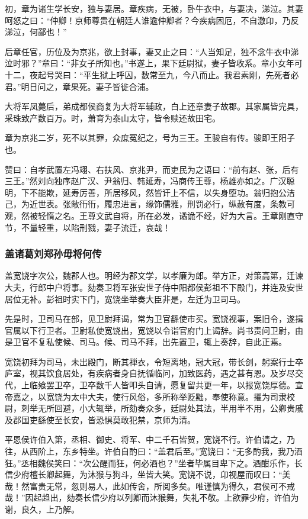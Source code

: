 \documentclass[]{article}
\begin{document}
初，章为诸生学长安，独与妻居。章疾病，无被，卧牛衣中，与妻决，涕泣。其妻呵怒之曰：``仲卿！京师尊贵在朝廷人谁逾仲卿者？今疾病困厄，不自激卬，乃反涕泣，何鄙也！''

后章任官，历位及为京兆，欲上封事，妻又止之曰：``人当知足，独不念牛衣中涕泣时邪？''章曰：``非女子所知也。''书遂上，果下廷尉狱，妻子皆收系。章小女年可十二，夜起号哭曰：``平生狱上呼囚，数常至九，今八而止。我君素刚，先死者必君。''明日问之，章果死。妻子皆徙合浦。

大将军凤薨后，弟成都侯商复为大将军辅政，白上还章妻子故郡。其家属皆完具，采珠致产数百万。时，萧育为泰山太守，皆令赎还故田宅。

章为京兆二岁，死不以其罪，众庶冤纪之，号为三王。王骏自有传。骏即王阳子也。

赞曰：自孝武置左冯翊、右扶风、京兆尹，而吏民为之语曰：``前有赵、张，后有三王。''然刘向独序赵广汉、尹翁归、韩延寿，冯商传王尊，杨雄亦如之。广汉聪明，下不能欺，延寿厉善，所居移风，然皆讦上不信，以失身堕功。翁归抱公洁己，为近世表。张敞衎衎，履忠进言，缘饰儒雅，刑罚必行，纵赦有度，条教可观，然被轻惰之名。王尊文武自将，所在必发，谲诡不经，好为大言。王章刚直守节，不量轻重，以陷刑戮，妻子流迁，哀哉！

\hypertarget{header-n5474}{%
\subsubsection{盖诸葛刘郑孙毋将何传}\label{header-n5474}}

盖宽饶字次公，魏郡人也。明经为郡文学，以孝廉为郎。举方正，对策高第，迁谏大夫，行郎中户将事。劾奏卫将军张安世子侍中阳都侯彭祖不下殿门，并连及安世居位无补。彭祖时实下门，宽饶坐举奏大臣非是，左迁为卫司马。

先是时，卫司马在部，见卫尉拜谒，常为卫官繇使市买。宽饶视事，案旧令，遂揖官属以下行卫者。卫尉私使宽饶出，宽饶以令诣官府门上谒辞。尚书责问卫尉，由是卫官不复私使候、司马。候、司马不拜，出先置卫，辄上奏辞，自此正焉。

宽饶初拜为司马，未出殿门，断其禅衣，令短离地，冠大冠，带长剑，躬案行士卒庐室，视其饮食居处，有疾病者身自抚循临问，加致医药，遇之甚有恩。及岁尽交代，上临飨罢卫卒，卫卒数千人皆叩头自请，愿复留共更一年，以报宽饶厚德。宣帝嘉之，以宽饶为太中大夫，使行风俗，多所称举贬黜，奉使称意。擢为司隶校尉，刺举无所回避，小大辄举，所劾奏众多，廷尉处其法，半用半不用，公卿贵戚及郡国吏繇使至长安，皆恐惧莫敢犯禁，京师为清。

平恩侯许伯入第，丞相、御史、将军、中二千石皆贺，宽饶不行。许伯请之，乃往，从西阶上，东乡特坐。许伯自酌曰：``盖君后至。''宽饶曰：``无多酌我，我乃酒狂。''丞相魏侯笑曰：``次公醒而狂，何必酒也？''坐者毕属目卑下之。酒酣乐作，长信少府檀长卿起舞，为沐猴与狗斗，坐皆大笑。宽饶不说，卬视屋而叹曰：``美哉！然富贵无常，忽则易人，此如传舍，所阅多矣。唯谨慎为得久，君侯可不戒哉！''因起趋出，劾奏长信少府以列卿而沐猴舞，失礼不敬。上欲罪少府，许伯为谢，良久，上乃解。
\end{document}
